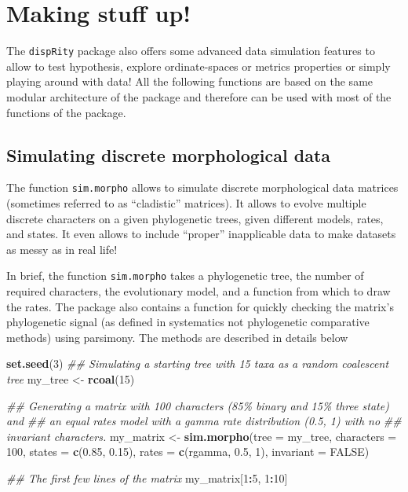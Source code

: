 \documentclass[
]{book}
\newenvironment{Shaded}{\begin{snugshade}}{\end{snugshade}}
\newcommand{\CommentTok}[1]{\textcolor[rgb]{0.56,0.35,0.01}{\textit{#1}}}
\newcommand{\DataTypeTok}[1]{\textcolor[rgb]{0.13,0.29,0.53}{#1}}
\newcommand{\DecValTok}[1]{\textcolor[rgb]{0.00,0.00,0.81}{#1}}
\newcommand{\FloatTok}[1]{\textcolor[rgb]{0.00,0.00,0.81}{#1}}
\newcommand{\KeywordTok}[1]{\textcolor[rgb]{0.13,0.29,0.53}{\textbf{#1}}}
\newcommand{\NormalTok}[1]{#1}
\newcommand{\OperatorTok}[1]{\textcolor[rgb]{0.81,0.36,0.00}{\textbf{#1}}}
\newcommand{\OtherTok}[1]{\textcolor[rgb]{0.56,0.35,0.01}{#1}}
\newcommand{\StringTok}[1]{\textcolor[rgb]{0.31,0.60,0.02}{#1}}
\begin{document}
\hypertarget{making-stuff-up}{%
\chapter{Making stuff up!}\label{making-stuff-up}}

The \texttt{dispRity} package also offers some advanced data simulation features to allow to test hypothesis, explore ordinate-spaces or metrics properties or simply playing around with data!
All the following functions are based on the same modular architecture of the package and therefore can be used with most of the functions of the package.

\hypertarget{simulating-discrete-morphological-data}{%
\section{Simulating discrete morphological data}\label{simulating-discrete-morphological-data}}

The function \texttt{sim.morpho} allows to simulate discrete morphological data matrices (sometimes referred to as ``cladistic'' matrices).
It allows to evolve multiple discrete characters on a given phylogenetic trees, given different models, rates, and states.
It even allows to include ``proper'' inapplicable data to make datasets as messy as in real life!

In brief, the function \texttt{sim.morpho} takes a phylogenetic tree, the number of required characters, the evolutionary model, and a function from which to draw the rates.
The package also contains a function for quickly checking the matrix's phylogenetic signal (as defined in systematics not phylogenetic comparative methods) using parsimony.
The methods are described in details below

\begin{Shaded}
\begin{Highlighting}[]
\KeywordTok{set.seed}\NormalTok{(}\DecValTok{3}\NormalTok{)}
\CommentTok{\#\# Simulating a starting tree with 15 taxa as a random coalescent tree}
\NormalTok{my\_tree \textless{}{-}}\StringTok{ }\KeywordTok{rcoal}\NormalTok{(}\DecValTok{15}\NormalTok{)}

\CommentTok{\#\# Generating a matrix with 100 characters (85\% binary and 15\% three state) and}
\CommentTok{\#\# an equal rates model with a gamma rate distribution (0.5, 1) with no }
\CommentTok{\#\# invariant characters.}
\NormalTok{my\_matrix \textless{}{-}}\StringTok{ }\KeywordTok{sim.morpho}\NormalTok{(}\DataTypeTok{tree =}\NormalTok{ my\_tree, }\DataTypeTok{characters =} \DecValTok{100}\NormalTok{, }\DataTypeTok{states =} \KeywordTok{c}\NormalTok{(}\FloatTok{0.85}\NormalTok{,}
    \FloatTok{0.15}\NormalTok{), }\DataTypeTok{rates =} \KeywordTok{c}\NormalTok{(rgamma, }\FloatTok{0.5}\NormalTok{, }\DecValTok{1}\NormalTok{), }\DataTypeTok{invariant =} \OtherTok{FALSE}\NormalTok{)}

\CommentTok{\#\# The first few lines of the matrix}
\NormalTok{my\_matrix[}\DecValTok{1}\OperatorTok{:}\DecValTok{5}\NormalTok{, }\DecValTok{1}\OperatorTok{:}\DecValTok{10}\NormalTok{]}
\end{Highlighting}
\end{Shaded}
\end{document}
